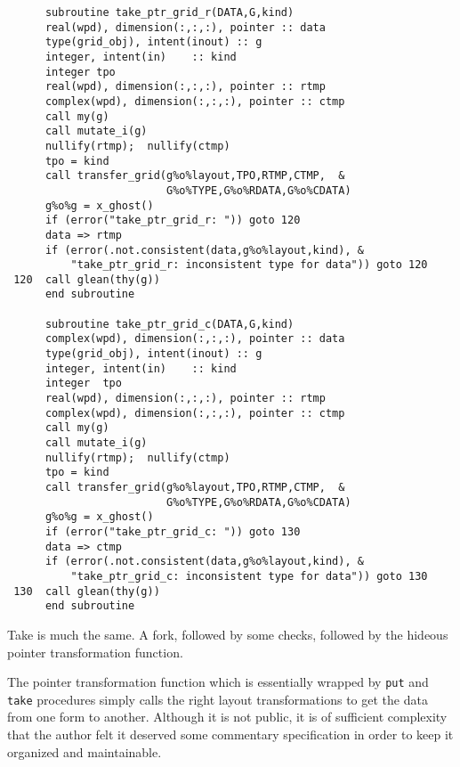 \begin{verbatim}
      subroutine take_ptr_grid_r(DATA,G,kind)
      real(wpd), dimension(:,:,:), pointer :: data
      type(grid_obj), intent(inout) :: g
      integer, intent(in)    :: kind
      integer tpo 
      real(wpd), dimension(:,:,:), pointer :: rtmp
      complex(wpd), dimension(:,:,:), pointer :: ctmp
      call my(g)
      call mutate_i(g)
      nullify(rtmp);  nullify(ctmp)
      tpo = kind
      call transfer_grid(g%o%layout,TPO,RTMP,CTMP,  &
                         G%o%TYPE,G%o%RDATA,G%o%CDATA)
      g%o%g = x_ghost()
      if (error("take_ptr_grid_r: ")) goto 120
      data => rtmp
      if (error(.not.consistent(data,g%o%layout,kind), &
          "take_ptr_grid_r: inconsistent type for data")) goto 120
 120  call glean(thy(g))
      end subroutine

      subroutine take_ptr_grid_c(DATA,G,kind)
      complex(wpd), dimension(:,:,:), pointer :: data
      type(grid_obj), intent(inout) :: g
      integer, intent(in)    :: kind
      integer  tpo
      real(wpd), dimension(:,:,:), pointer :: rtmp
      complex(wpd), dimension(:,:,:), pointer :: ctmp
      call my(g)
      call mutate_i(g)
      nullify(rtmp);  nullify(ctmp)
      tpo = kind
      call transfer_grid(g%o%layout,TPO,RTMP,CTMP,  &
                         G%o%TYPE,G%o%RDATA,G%o%CDATA)
      g%o%g = x_ghost()
      if (error("take_ptr_grid_c: ")) goto 130
      data => ctmp
      if (error(.not.consistent(data,g%o%layout,kind), &
          "take_ptr_grid_c: inconsistent type for data")) goto 130
 130  call glean(thy(g))
      end subroutine
\end{verbatim}
Take is much the same.  A fork, followed by some checks, followed by
the hideous pointer transformation function.

The pointer transformation function which is essentially wrapped
by \verb+put+ and \verb+take+ procedures simply calls the right
layout transformations to get the data from one form to another.
Although it is not public, it is of sufficient complexity that the author
felt it deserved some commentary specification in order to keep it 
organized and maintainable.

